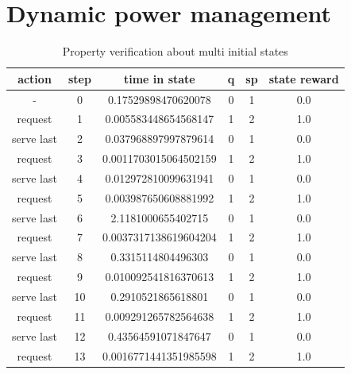 \section{Dynamic power management}

\begin{table}[ht]
  \begin{center}
    \begin{tabular}{cccccc}
      \hline
      action & step & time in state & q & sp & state reward  \\ 
      \hline
      - & 0 & 0.17529898470620078 & 0 & 1 & 0.0 \\
       request  & 1 & 0.005583448654568147 & 1 & 2 & 1.0 \\
       serve last  & 2 & 0.037968897997879614 & 0 & 1 & 0.0 \\ 
       request  & 3 & 0.0011703015064502159 & 1 & 2 & 1.0 \\
       serve last  & 4 & 0.012972810099631941 & 0 & 1 & 0.0 \\
       request  & 5 & 0.003987650608881992 & 1 & 2 & 1.0 \\
       serve last  & 6 & 2.1181000655402715 & 0 & 1 & 0.0 \\
       request  & 7 & 0.0037317138619604204 & 1 & 2 & 1.0 \\
       serve last  & 8 & 0.3315114804496303 & 0 & 1 & 0.0 \\
       request  & 9 & 0.010092541816370613 & 1 & 2 & 1.0 \\
       serve last  & 10 & 0.2910521865618801 & 0 & 1 & 0.0 \\
       request  & 11 & 0.009291265782564638 & 1 & 2 & 1.0 \\
       serve last  & 12 & 0.43564591071847647 & 0 & 1 & 0.0 \\
       request  & 13 & 0.0016771441351985598 & 1 & 2 & 1.0 \\
      \hline
    \end{tabular}
    \caption{Property verification about multi initial states}
    \label{table:herman-log-chunck-multi-initial-states}
  \end{center}
\end{table}

